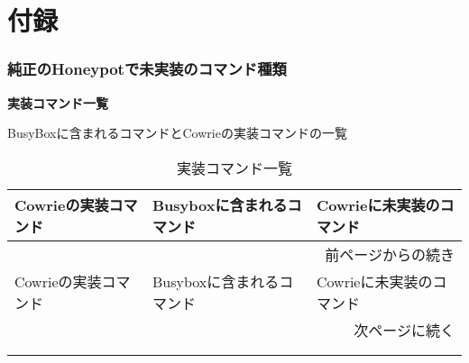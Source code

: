 \appendix
\chapter{付録}


\subsection{純正のHoneypotで未実装のコマンド種類}
\label{appendix
}
\begin{center}
\large{\textbf{実装コマンド一覧}}
\end{center}

BusyBoxに含まれるコマンドとCowrieの実装コマンドの一覧
 
\begin{longtable}{llp{50mm}}
  \caption{実装コマンド一覧}
  \label{table:command} \\
  \hline
  Cowrieの実装コマンド & Busyboxに含まれるコマンド & Cowrieに未実装のコマンド \\ \hline\hline
  \endfirsthead
  \multicolumn{3}{r}{前ページからの続き} \\ \hline
  Cowrieの実装コマンド　& Busyboxに含まれるコマンド & Cowrieに未実装のコマンド \\ \hline\hline
  \endhead
  \hline
  \multicolumn{3}{r}{次ページに続く} \\
  \endfoot
  \hline
  \multicolumn{3}{r}{以上} \\
  \endlastfoot


\end{longtable}
